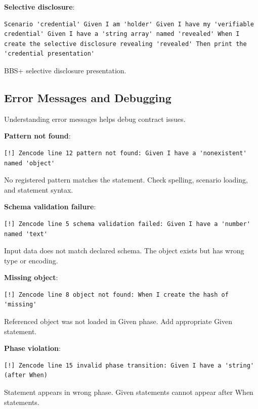 \textbf{Selective disclosure}:

\begin{verbatim}
Scenario 'credential' Given I am 'holder' Given I have my 'verifiable
credential' Given I have a 'string array' named 'revealed' When I
create the selective disclosure revealing 'revealed' Then print the
'credential presentation'
\end{verbatim}

BBS+ selective disclosure presentation.

\subsection{Error Messages and Debugging}

Understanding error messages helps debug contract issues.

\textbf{Pattern not found}:

\begin{verbatim}
[!] Zencode line 12 pattern not found: Given I have a 'nonexistent'
named 'object'
\end{verbatim}

No registered pattern matches the statement. Check spelling, scenario
loading, and statement syntax.

\textbf{Schema validation failure}:

\begin{verbatim}
[!] Zencode line 5 schema validation failed: Given I have a 'number'
named 'text'
\end{verbatim}

Input data does not match declared schema. The object exists but has
wrong type or encoding.

\textbf{Missing object}:

\begin{verbatim}
[!] Zencode line 8 object not found: When I create the hash of
'missing'
\end{verbatim}

Referenced object was not loaded in Given phase. Add appropriate Given
statement.

\textbf{Phase violation}:

\begin{verbatim}
[!] Zencode line 15 invalid phase transition: Given I have a 'string'
(after When)
\end{verbatim}

Statement appears in wrong phase. Given statements cannot appear after
When statements.

